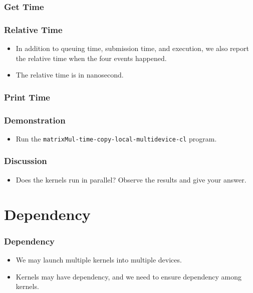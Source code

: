 \documentclass{beamer}
\begin{document}
\begin{frame}
  \frametitle{Get Time}
\end{frame}

\begin{frame}
  \frametitle{Relative Time}
  \begin{itemize}
    \item In addition to queuing time, submission time, and
      execution, we also report the relative time when the four
      events happened.
    \item The relative time is in nanosecond.
  \end{itemize}
\end{frame}

\begin{frame}
  \frametitle{Print Time}
\end{frame}

\begin{frame}
  \frametitle{Demonstration}
  \begin{itemize}
    \item Run the {\tt matrixMul-time-copy-local-multidevice-cl} program.
  \end{itemize}
\end{frame}

\begin{frame}
  \frametitle{Discussion}
  \begin{itemize}
    \item Does the kernels run in parallel? Observe the results and
      give your answer.
  \end{itemize}
\end{frame}

\section{Dependency}

\begin{frame}
  \frametitle{Dependency}
  \begin{itemize}
    \item We may launch multiple kernels into multiple devices.
    \item Kernels may have dependency, and we need to ensure dependency
    among kernels.
  \end{itemize}
\end{frame}
\end{document}
